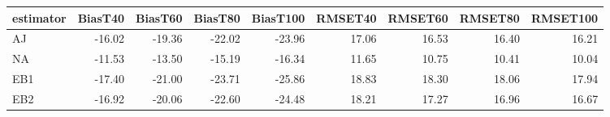 \begin{table}[ht]
\centering
\begin{tabular}{lrrrrrrrr}
  \toprule
estimator & BiasT40 & BiasT60 & BiasT80 & BiasT100 & RMSET40 & RMSET60 & RMSET80 & RMSET100 \\ 
  \midrule
AJ & -16.02 & -19.36 & -22.02 & -23.96 & 17.06 & 16.53 & 16.40 & 16.21 \\ 
  NA & -11.53 & -13.50 & -15.19 & -16.34 & 11.65 & 10.75 & 10.41 & 10.04 \\ 
  EB1 & -17.40 & -21.00 & -23.71 & -25.86 & 18.83 & 18.30 & 18.06 & 17.94 \\ 
  EB2 & -16.92 & -20.06 & -22.60 & -24.48 & 18.21 & 17.27 & 16.96 & 16.67 \\ 
   \bottomrule
\end{tabular}
\end{table}
